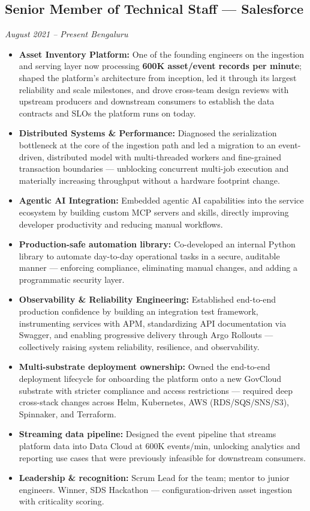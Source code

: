 \documentclass[10pt,a4paper]{article}
\newcommand{\role}[4]{%
    \subsection*{#1 \textnormal{---} #2}%
    \vspace{-4pt}%
    {\color{muted}\textit{#3 \textbar{} #4}}%
    \vspace{2pt}%
}
\newcommand{\tag}[1]{\textbf{#1:}}
\begin{document}
\role{Senior Member of Technical Staff}{Salesforce}{August 2021 -- Present}{Bengaluru}
\begin{itemize}
    \item \tag{Asset Inventory Platform} One of the founding engineers on the ingestion and serving layer now processing \textbf{600K asset/event records per minute}; shaped the platform's architecture from inception, led it through its largest reliability and scale milestones, and drove cross-team design reviews with upstream producers and downstream consumers to establish the data contracts and SLOs the platform runs on today.
    \item \tag{Distributed Systems \& Performance} Diagnosed the serialization bottleneck at the core of the ingestion path and led a migration to an event-driven, distributed model with multi-threaded workers and fine-grained transaction boundaries --- unblocking concurrent multi-job execution and materially increasing throughput without a hardware footprint change.
    \item \tag{Agentic AI Integration} Embedded agentic AI capabilities into the service ecosystem by building custom MCP servers and skills, directly improving developer productivity and reducing manual workflows.
    \item \tag{Production-safe automation library} Co-developed an internal Python library to automate day-to-day operational tasks in a secure, auditable manner — enforcing compliance, eliminating manual changes, and adding a programmatic security layer.
    \item \tag{Observability \& Reliability Engineering} Established end-to-end production confidence by building an integration test framework, instrumenting services with APM, standardizing API documentation via Swagger, and enabling progressive delivery through Argo Rollouts — collectively raising system reliability, resilience, and observability.
    \item \tag{Multi-substrate deployment ownership} Owned the end-to-end deployment lifecycle for onboarding the platform onto a new GovCloud substrate with stricter compliance and access restrictions — required deep cross-stack changes across Helm, Kubernetes, AWS (RDS/SQS/SNS/S3), Spinnaker, and Terraform.
    \item \tag{Streaming data pipeline} Designed the event pipeline that streams platform data into Data Cloud at 600K events/min, unlocking analytics and reporting use cases that were previously infeasible for downstream consumers.
    \item \tag{Leadership \& recognition} Scrum Lead for the team; mentor to junior engineers. Winner, SDS Hackathon — configuration-driven asset ingestion with criticality scoring.
\end{itemize}
\end{document}
